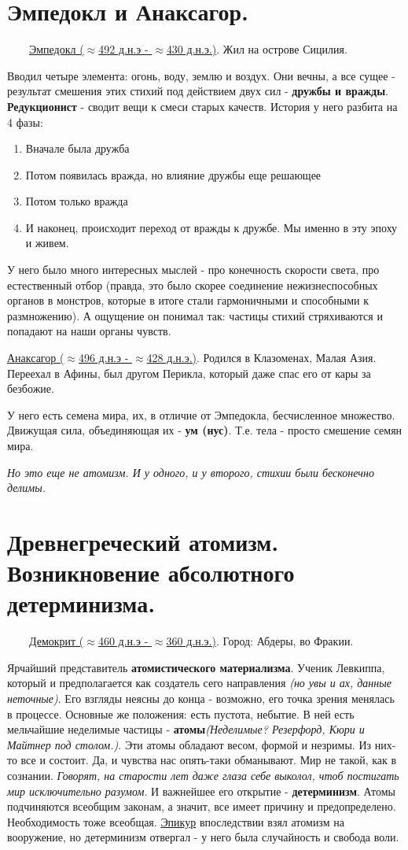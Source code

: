 \documentclass[12pt,a4paper]{article}
\begin{document}
\section{Эмпедокл и Анаксагор.}
\ \ \ \
\underline{Эмпедокл ($\approx$492 д.н.э - $\approx$430 д.н.э.)}. Жил на острове Сицилия.

Вводил четыре элемента: огонь, воду, землю и воздух. Они вечны, а все сущее - результат смешения этих стихий под действием двух сил - \textbf{дружбы и вражды}. \textbf{Редукционист} - сводит вещи к смеси старых качеств. История у него разбита на 4 фазы:
\begin{enumerate}
\item Вначале была дружба
\item Потом появилась вражда, но влияние дружбы еще решающее
\item Потом только вражда
\item И наконец, происходит переход от вражды к дружбе. Мы именно в эту эпоху и живем.
\end{enumerate}
У него было много интересных мыслей - про конечность скорости света, про естественный отбор (правда, это было скорее соединение нежизнеспособных органов в монстров, которые в итоге стали гармоничными и способными к размножению). А ощущение он понимал так: частицы стихий стряхиваются и попадают на наши органы чувств.

\underline{Анаксагор ($\approx$496 д.н.э - $\approx$428 д.н.э.)}. Родился в Клазоменах, Малая Азия. Переехал в Афины, был другом Перикла, который даже спас его от кары за безбожие.

У него есть семена мира, их, в отличие от Эмпедокла, бесчисленное множество. Движущая сила, объединяющая их - \textbf{ум (нус)}. Т.е. тела - просто смешение семян мира.

\textit{Но это еще не атомизм. И у одного, и у второго, стихии были бесконечно делимы.} 

\section{Древнегреческий атомизм. Возникновение абсолютного детерминизма.}
\ \ \ \
\underline{Демокрит ($\approx$460 д.н.э - $\approx$360 д.н.э.)}. Город: Абдеры, во Фракии.

Ярчайший представитель \textbf{атомистического материализма}.
Ученик Левкиппа, который и предполагается как создатель сего направления \textit{(но увы и ах, данные неточные)}.
Его взгляды неясны до конца - возможно, его точка зрения менялась в процессе. Основные же положения:
есть пустота, небытие. В ней есть мельчайшие неделимые частицы - \textbf{атомы}\textit{(Неделимые? Резерфорд, Кюри и Майтнер под столом.)}. Эти атомы обладают весом, формой и незримы. Из них-то все и состоит. Да, и чувства нас опять-таки обманывают. Мир не такой, как в сознании. \textit{Говорят, на старости лет даже глаза себе выколол, чтоб постигать мир исключительно разумом}. И важнейшее его открытие - \textbf{детерминизм}. Атомы подчиняются всеобщим законам, а значит, все имеет причину и предопределено. Необходимость тоже всеобщая. \underline{Эпикур} впоследствии взял атомизм на вооружение, но детерминизм отвергал - у него была случайность и свобода воли.
\end{document}
